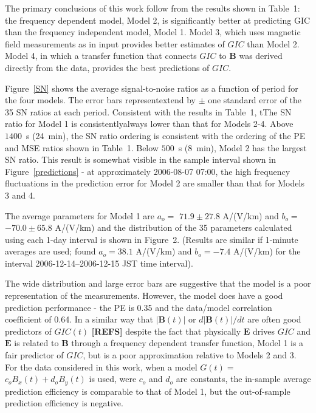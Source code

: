 \documentclass[draft,linenumbers]{agujournal2018}
\begin{document}
The primary conclusions of this work follow from the results shown in Table~1: the frequency dependent model, Model 2, is significantly better at predicting GIC than the frequency independent model, Model 1. Model 3, which uses magnetic field measurements as in input provides better estimates of $GIC$ than Model 2. Model 4, in which a transfer function that connects $GIC$ to $\mathbf{B}$ was derived directly from the data, provides the best predictions of $GIC$.

Figure~\ref{SN} shows the average signal-to-noise ratios as a function of period for the four models. The error bars representextend by $\pm$ one standard error of the 35 SN ratios at each period. Consistent with the results in Table~1, tThe SN ratio for Model 1 is consistentlyalways lower than that for Models 2-4.  Above $1400$~s (24~min), the SN ratio ordering is consistent with the ordering of the PE and MSE ratios shown in Table~1. Below $500$~s (8~min), Model 2 has the largest SN ratio. This result is somewhat visible in the sample interval shown in Figure~\ref{predictions} - at approximately 2006-08-07 07:00, the high frequency fluctuations in the prediction error for Model 2 are smaller than that for Models 3 and 4.

The average parameters for Model 1 are $a_o = $ $71.9 \pm 27.8$ A/(V/km) and $b_o =$ $-70.0 \pm 65.8$ A/(V/km) and the distribution of the 35 parameters calculated using each 1-day interval is shown in Figure~2. (Results are similar if 1-minute averages are used; \cite{Watari2015} found  $a_o=38.1$ A/(V/km) and $b_o=-7.4$ A/(V/km) for the interval 2006-12-14--2006-12-15 JST time interval).

The wide distribution and large error bars are suggestive that the model is a poor representation of the measurements. However, the model does have a good prediction performance - the PE is 0.35 and the data/model correlation coefficient of 0.64. In a similar way that $|\mathbf{B}(t)|$ or $d|\mathbf{B}(t)|/dt$ are often good predictors of $GIC(t)$   {\color{red} \textbf{[REFS]}} despite the fact that physically $\mathbf{E}$ drives $GIC$ and $\mathbf{E}$ is related to $\mathbf{B}$ through a frequency dependent transfer function, Model 1 is a fair predictor of $GIC$, but is a poor approximation relative to Models 2 and 3. For the data considered in this work, when a model $G(t) = $ $c_oB_x(t) + d_oB_y(t)$ is used, were $c_o$ and $d_o$ are constants, the in-sample average prediction efficiency is comparable to that of Model 1, but the out-of-sample prediction efficiency is negative.
\end{document}
